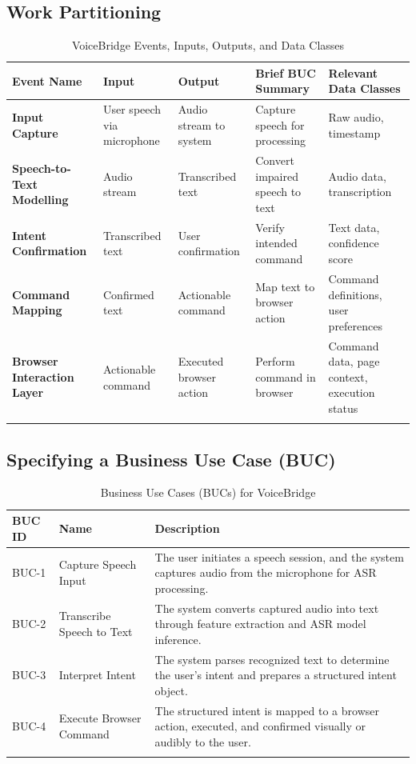 \documentclass[11pt]{article}
\begin{document}
\subsection{Work Partitioning}
\begin{table}[H]
\centering
\begin{tabularx}{\textwidth}{X X X X X}
\toprule
\textbf{Event Name} & \textbf{Input} & \textbf{Output} & \textbf{Brief BUC Summary} & \textbf{Relevant Data Classes} \\
\midrule
\textbf{Input Capture} & User speech via microphone & Audio stream to system & Capture speech for processing & Raw audio, timestamp \\
\hline
\textbf{Speech-to-Text Modelling} & Audio stream & Transcribed text & Convert impaired speech to text & Audio data, transcription \\
\hline
\textbf{Intent Confirmation} & Transcribed text & User confirmation & Verify intended command & Text data, confidence score \\
\hline
\textbf{Command Mapping} & Confirmed text & Actionable command & Map text to browser action & Command definitions, user preferences \\
\hline
\textbf{Browser Interaction Layer} & Actionable command & Executed browser action & Perform command in browser & Command data, page context, execution status \\
\bottomrule
\caption{VoiceBridge Events, Inputs, Outputs, and Data Classes}
\end{tabularx}
\end{table}

\subsection{Specifying a Business Use Case (BUC)} 


\begin{table}[H]
\centering
\begin{tabularx}{\textwidth}{p{2cm}p{3cm}X}
\toprule
\textbf{BUC ID} & \textbf{Name} & \textbf{Description} \\
\midrule
BUC-1 & Capture Speech Input & The user initiates a speech session, and the system captures audio from the microphone for ASR processing. \\
\hline
BUC-2 & Transcribe Speech to Text & The system converts captured audio into text through feature extraction and ASR model inference. \\
\hline
BUC-3 & Interpret Intent & The system parses recognized text to determine the user’s intent and prepares a structured intent object. \\
\hline
BUC-4 & Execute Browser Command & The structured intent is mapped to a browser action, executed, and confirmed visually or audibly to the user. \\
\bottomrule
\caption{Business Use Cases (BUCs) for VoiceBridge}
\end{tabularx}
\end{table}
\end{document}
